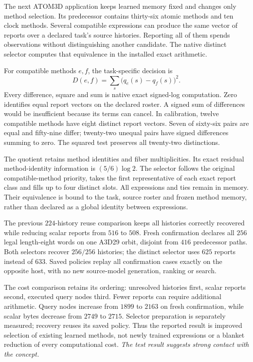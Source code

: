 The next ATOM3D application keeps learned memory fixed and changes only method selection. Its predecessor contains thirty-six atomic methods and ten clock methods. Several compatible expressions can produce the same vector of reports over a declared task's source histories. Reporting all of them spends observations without distinguishing another candidate. The native distinct selector computes that equivalence in the installed exact arithmetic. 

For compatible methods $e,f$, the task-specific decision is
\[
 D(e,f)=\sum_s\big(q_e(s)-q_f(s)\big)^2.
\]
Every difference, square and sum is native exact signed-log computation. Zero identifies equal report vectors on the declared roster. A signed sum of differences would be insufficient because its terms can cancel. In calibration, twelve compatible methods have eight distinct report vectors. Seven of sixty-six pairs are equal and fifty-nine differ; twenty-two unequal pairs have signed differences summing to zero. The squared test preserves all twenty-two distinctions.

The quotient retains method identities and fiber multiplicities. Its exact residual method-identity information is $(5/6)\log2$. The selector follows the original compatible-method priority, takes the first representative of each exact report class and fills up to four distinct slots. All expressions and ties remain in memory. Their equivalence is bound to the task, source roster and frozen method memory, rather than declared as a global identity between expressions.

The previous $224$-history reuse comparison keeps all histories correctly recovered while reducing scalar reports from $516$ to $508$. Fresh confirmation declares all $256$ legal length-eight words on one A3D29 orbit, disjoint from $416$ predecessor paths. Both selectors recover $256/256$ histories; the distinct selector uses $625$ reports instead of $633$. Saved policies replay all confirmation cases exactly on the opposite host, with no new source-model generation, ranking or search.

The cost comparison retains its ordering: unresolved histories first, scalar reports second, executed query nodes third. Fewer reports can require additional arithmetic. Query nodes increase from $1899$ to $2163$ on fresh confirmation, while scalar bytes decrease from $2749$ to $2715$. Selector preparation is separately measured; recovery reuses its saved policy. Thus the reported result is improved selection of existing learned methods, not newly trained expressions or a blanket reduction of every computational cost. \emph{The test result suggests strong contact with the concept.}


